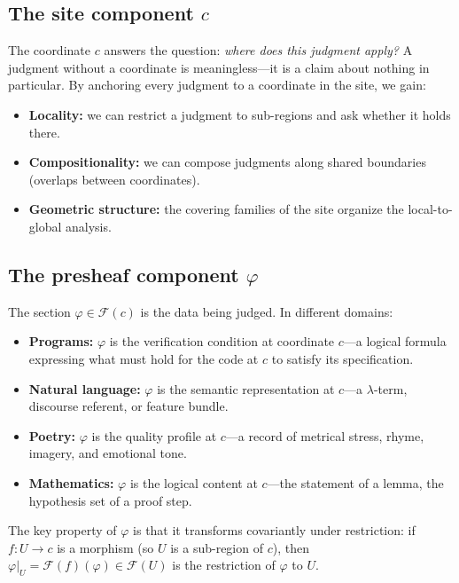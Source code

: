 \subsection{The site component \texorpdfstring{$c$}{c}}
\label{sec:judgment:site-component}

The coordinate $c$ answers the question: \emph{where does this
judgment apply?}  A judgment without a coordinate is meaningless---it
is a claim about nothing in particular.  By anchoring every judgment
to a coordinate in the site, we gain:

\begin{itemize}
\item \textbf{Locality:} we can restrict a judgment to sub-regions
  and ask whether it holds there.
\item \textbf{Compositionality:} we can compose judgments along shared
  boundaries (overlaps between coordinates).
\item \textbf{Geometric structure:} the covering families of the site
  organize the local-to-global analysis.
\end{itemize}

\subsection{The presheaf component \texorpdfstring{$\varphi$}{φ}}
\label{sec:judgment:presheaf-component}

The section $\varphi \in \mathcal{F}(c)$ is the data being judged.
In different domains:

\begin{itemize}
\item \textbf{Programs:} $\varphi$ is the verification condition at
  coordinate $c$---a logical formula expressing what must hold for the
  code at $c$ to satisfy its specification.
\item \textbf{Natural language:} $\varphi$ is the semantic
  representation at $c$---a $\lambda$-term, discourse referent, or
  feature bundle.
\item \textbf{Poetry:} $\varphi$ is the quality profile at $c$---a
  record of metrical stress, rhyme, imagery, and emotional tone.
\item \textbf{Mathematics:} $\varphi$ is the logical content at
  $c$---the statement of a lemma, the hypothesis set of a proof step.
\end{itemize}

The key property of $\varphi$ is that it transforms covariantly under
restriction: if $f : U \to c$ is a morphism (so $U$ is a sub-region of
$c$), then $\varphi|_U = \mathcal{F}(f)(\varphi) \in \mathcal{F}(U)$
is the restriction of $\varphi$ to $U$.

